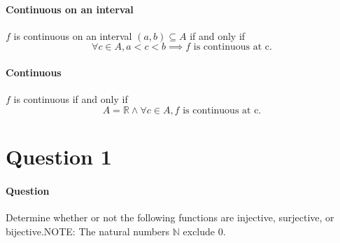 \documentclass{article}
\begin{document}
\paragraph{Continuous on an interval}
$f$ is continuous on an interval $(a,b) \subseteq A$ if and only if
\begin{displaymath}
\forall c \in A, a < c < b \implies f \textrm{ is continuous at c.}
\end{displaymath}
\paragraph{Continuous}
$f$ is continuous if and only if 
\begin{displaymath}
A = \mathbb{R} \land \forall c \in A, f \text{ is continuous at c.}
\end{displaymath}
\pagebreak
\section{Question 1}
\paragraph{Question}
Determine whether or not the following functions are injective, surjective, or bijective.\newline NOTE: The natural numbers $\mathbb{N}$ exclude 0.
\end{document}
